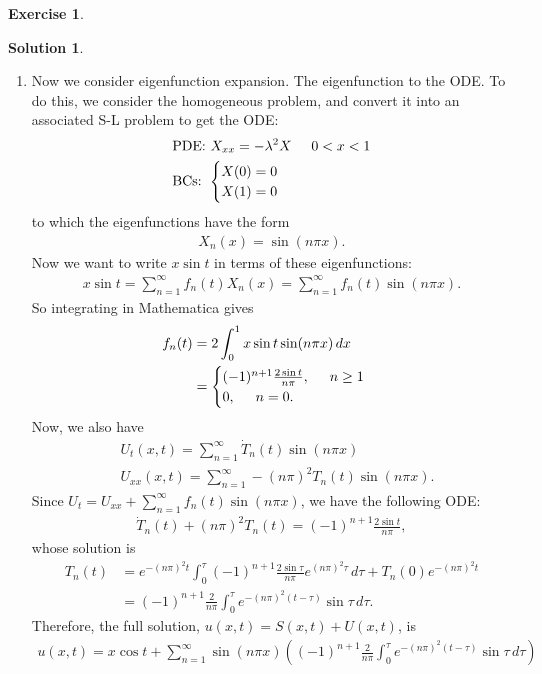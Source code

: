 \documentclass{book}
\theoremstyle{definition}
\newtheorem*{exer*}{Exercise}
\newtheorem*{sln*}{Solution}
\begin{document}
\begin{exer*}
\begin{sln*}
\begin{enumerate}
			\item Now we consider eigenfunction expansion. The eigenfunction to the ODE. To do this, we consider the homogeneous problem, and convert it into an associated S-L problem to get the ODE:
			\begin{align*}
			&\text{PDE: }  X_{xx} = -\lambda^2 X \hspace{0.5cm} 0 < x < 1\\
			&\text{BCs: } \begin{cases}
			X(0) = 0\\
			X(1) = 0
			\end{cases}
			\end{align*}
			to which the eigenfunctions have the form
			\begin{align*}
			X_n(x) = \sin(n\pi x).
			\end{align*}
			Now we want to write $x\sin t$ in terms of these eigenfunctions:
			\begin{align*}
			x\sin t = \sum^\infty_{n=1}f_n(t)X_n(x) = \sum^\infty_{n=1}f_n(t)\sin(n\pi x).
			\end{align*}
			So integrating in Mathematica gives
			\begin{align*}
			f_n(t) &= 2\int^1_0 x\sin t\sin(n\pi x)\,dx\\
			&= 
			\begin{cases}
			(-1)^{n+1}\frac{2\sin t}{n\pi}, \hspace{0.5cm} n \geq 1\\
			0, \hspace{0.5cm} n =0.
			\end{cases}
			\end{align*}
			Now, we also have 
			\begin{align*}
			&U_t(x,t) = \sum^\infty_{n=1}\dot{T}_n(t)\sin(n\pi x)\\
			&U_{xx}(x,t) = \sum^\infty_{n=1}-(n\pi)^2T_n(t)\sin(n\pi x).
			\end{align*}
			Since $U_t = U_{xx} + \sum^\infty_{n=1}f_n(t)\sin(n\pi x)$, we have the following ODE:
			\begin{align*}
			\dot{T}_n(t) + (n\pi)^2T_n(t) = (-1)^{n+1}\frac{2\sin t}{n\pi},
			\end{align*}
			whose solution is
			\begin{align*}
			T_n(t) &= e^{-(n\pi)^2t}\int^\tau_0 (-1)^{n+1}\frac{2\sin \tau}{n\pi}e^{(n\pi)^2\tau}\,d\tau + T_n(0)e^{-(n\pi)^2t} \\
			&= (-1)^{n+1}\frac{2}{n\pi}\int^\tau_0 e^{-(n\pi)^2(t-\tau)}\sin\tau \,d\tau.
			\end{align*}
			Therefore, the full solution, $u(x,t) = S(x,t) + U(x,t)$, is
			\begin{align*}
			\boxed{u(x,t) = x\cos t + \sum^\infty_{n=1}\sin(n\pi x)\left((-1)^{n+1}\frac{2}{n\pi}\int^\tau_0 e^{-(n\pi)^2(t-\tau)}\sin\tau \,d\tau\right)}
			\end{align*}
			

\end{enumerate}
\end{sln*}
\end{exer*}
\end{document}

